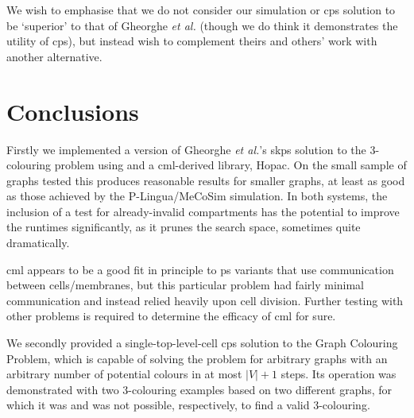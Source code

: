We wish to emphasise that we do not consider our simulation or \gls{cps} solution to be `superior' to that of Gheorghe \textit{et al.} (though we do think it demonstrates the utility of \gls{cps}), but instead wish to complement theirs and others' work with another alternative.





\section{\label{sec:gcol:conc}Conclusions}
Firstly we implemented a version of Gheorghe \textit{et al.}'s \gls{skps} solution to the 3-colouring problem using \fsharp{} and a \gls{cml}-derived library, Hopac.   On the small sample of graphs tested this produces reasonable results for smaller graphs, at least as good as those achieved by the P-Lingua/MeCoSim simulation.  In both systems, the inclusion of a test for already-invalid compartments has the potential to improve the runtimes significantly, as it prunes the search space, sometimes quite dramatically.

\gls{cml} appears to be a good fit in principle to \gls{ps} variants that use communication between cells/membranes, but this particular problem had fairly minimal communication and instead relied heavily upon cell division.  Further testing with other problems is required to determine the efficacy of \gls{cml} for sure.

We secondly provided a single-top-level-cell \gls{cps} solution to the Graph Colouring Problem, which is capable of solving the problem for arbitrary graphs with an arbitrary number of potential colours in at most \(|V| + 1\) steps.  Its operation was demonstrated with two 3-colouring examples based on two different graphs, for which it was and was not possible, respectively, to find a valid 3-colouring.

